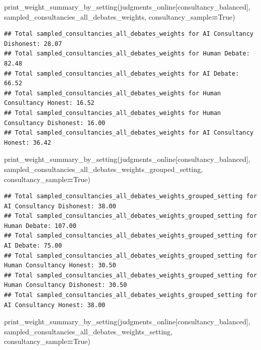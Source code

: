 \documentclass[
]{article}
\newenvironment{Shaded}{\begin{snugshade}}{\end{snugshade}}
\newcommand{\NormalTok}[1]{#1}
\newcommand{\OperatorTok}[1]{\textcolor[rgb]{0.81,0.36,0.00}{\textbf{#1}}}
\newcommand{\StringTok}[1]{\textcolor[rgb]{0.31,0.60,0.02}{#1}}
\newcommand{\VariableTok}[1]{\textcolor[rgb]{0.00,0.00,0.00}{#1}}
\begin{document}
\begin{Shaded}
\begin{Highlighting}[]
\NormalTok{print\_weight\_summary\_by\_setting(judgments\_online[consultancy\_balanced], }\StringTok{\textquotesingle{}sampled\_consultancies\_all\_debates\_weights\textquotesingle{}}\NormalTok{, consultancy\_sample}\OperatorTok{=}\VariableTok{True}\NormalTok{)}
\end{Highlighting}
\end{Shaded}

\begin{verbatim}
## Total sampled_consultancies_all_debates_weights for AI Consultancy Dishonest: 28.07
## Total sampled_consultancies_all_debates_weights for Human Debate: 82.48
## Total sampled_consultancies_all_debates_weights for AI Debate: 66.52
## Total sampled_consultancies_all_debates_weights for Human Consultancy Honest: 16.52
## Total sampled_consultancies_all_debates_weights for Human Consultancy Dishonest: 16.00
## Total sampled_consultancies_all_debates_weights for AI Consultancy Honest: 36.42
\end{verbatim}

\begin{Shaded}
\begin{Highlighting}[]
\NormalTok{print\_weight\_summary\_by\_setting(judgments\_online[consultancy\_balanced], }\StringTok{\textquotesingle{}sampled\_consultancies\_all\_debates\_weights\_grouped\_setting\textquotesingle{}}\NormalTok{, consultancy\_sample}\OperatorTok{=}\VariableTok{True}\NormalTok{)}
\end{Highlighting}
\end{Shaded}

\begin{verbatim}
## Total sampled_consultancies_all_debates_weights_grouped_setting for AI Consultancy Dishonest: 38.00
## Total sampled_consultancies_all_debates_weights_grouped_setting for Human Debate: 107.00
## Total sampled_consultancies_all_debates_weights_grouped_setting for AI Debate: 75.00
## Total sampled_consultancies_all_debates_weights_grouped_setting for Human Consultancy Honest: 30.50
## Total sampled_consultancies_all_debates_weights_grouped_setting for Human Consultancy Dishonest: 30.50
## Total sampled_consultancies_all_debates_weights_grouped_setting for AI Consultancy Honest: 38.00
\end{verbatim}

\begin{Shaded}
\begin{Highlighting}[]
\NormalTok{print\_weight\_summary\_by\_setting(judgments\_online[consultancy\_balanced], }\StringTok{\textquotesingle{}sampled\_consultancies\_all\_debates\_weights\_setting\textquotesingle{}}\NormalTok{, consultancy\_sample}\OperatorTok{=}\VariableTok{True}\NormalTok{)}
\end{Highlighting}
\end{Shaded}
\end{document}
